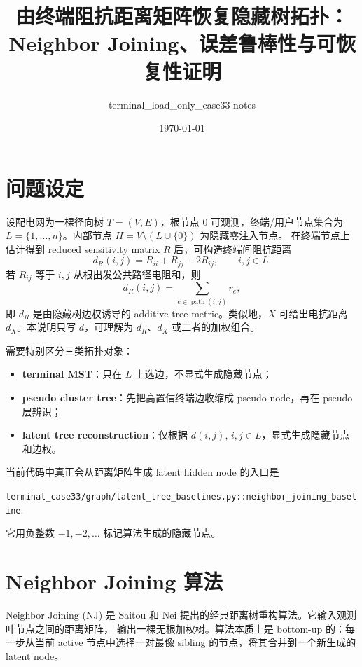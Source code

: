 \documentclass[UTF8,11pt]{ctexart}
\title{由终端阻抗距离矩阵恢复隐藏树拓扑：Neighbor Joining、误差鲁棒性与可恢复性证明}
\author{terminal\_load\_only\_case33 notes}
\date{\today}
\begin{document}
\maketitle

\section{问题设定}

设配电网为一棵径向树 $T=(V,E)$，根节点 $0$ 可观测，终端/用户节点集合为
$L=\{1,\ldots,n\}$。内部节点 $H=V\setminus (L\cup\{0\})$ 为隐藏零注入节点。
在终端节点上估计得到 reduced sensitivity matrix $R$ 后，可构造终端间阻抗距离
\begin{equation}
  d_R(i,j)=R_{ii}+R_{jj}-2R_{ij},\qquad i,j\in L.
\end{equation}
若 $R_{ij}$ 等于 $i,j$ 从根出发公共路径电阻和，则
\begin{equation}
  d_R(i,j)=\sum_{e\in \operatorname{path}(i,j)} r_e,
\end{equation}
即 $d_R$ 是由隐藏树边权诱导的 additive tree metric。类似地，$X$ 可给出电抗距离
$d_X$。本说明只写 $d$，可理解为 $d_R$、$d_X$ 或二者的加权组合。

需要特别区分三类拓扑对象：
\begin{itemize}[leftmargin=2em]
  \item \textbf{terminal MST}：只在 $L$ 上选边，不显式生成隐藏节点；
  \item \textbf{pseudo cluster tree}：先把高置信终端边收缩成 pseudo node，再在 pseudo 层辨识；
  \item \textbf{latent tree reconstruction}：仅根据 $d(i,j),\,i,j\in L$，显式生成隐藏节点和边权。
\end{itemize}

当前代码中真正会从距离矩阵生成 latent hidden node 的入口是
\begin{center}
\texttt{terminal\_case33/graph/latent\_tree\_baselines.py::neighbor\_joining\_baseline}.
\end{center}
它用负整数 $-1,-2,\ldots$ 标记算法生成的隐藏节点。

\section{Neighbor Joining 算法}

Neighbor Joining (NJ) 是 Saitou 和 Nei 提出的经典距离树重构算法。它输入观测叶节点之间的距离矩阵，
输出一棵无根加权树。算法本质上是 bottom-up 的：每一步从当前 active 节点中选择一对最像 sibling
的节点，将其合并到一个新生成的 latent node。
\end{document}
